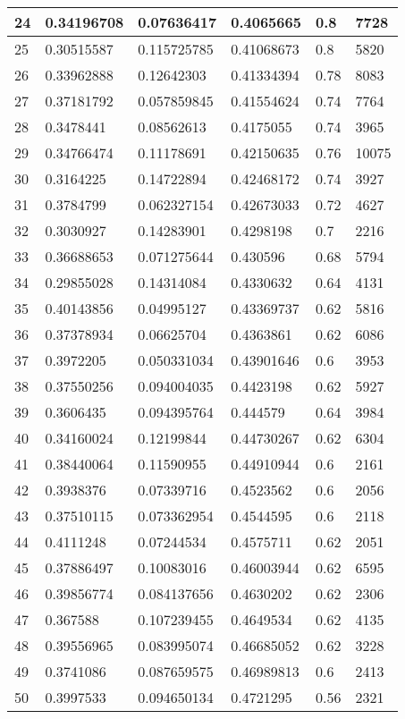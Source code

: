 \begin{longtable}{|l|l|l|l|l|l|}
24 & 0.34196708 & 0.07636417 & 0.4065665 & 0.8 & 7728 \\ \hline 
25 & 0.30515587 & 0.115725785 & 0.41068673 & 0.8 & 5820 \\ \hline 
26 & 0.33962888 & 0.12642303 & 0.41334394 & 0.78 & 8083 \\ \hline 
27 & 0.37181792 & 0.057859845 & 0.41554624 & 0.74 & 7764 \\ \hline 
28 & 0.3478441 & 0.08562613 & 0.4175055 & 0.74 & 3965 \\ \hline 
29 & 0.34766474 & 0.11178691 & 0.42150635 & 0.76 & 10075 \\ \hline 
30 & 0.3164225 & 0.14722894 & 0.42468172 & 0.74 & 3927 \\ \hline 
31 & 0.3784799 & 0.062327154 & 0.42673033 & 0.72 & 4627 \\ \hline 
32 & 0.3030927 & 0.14283901 & 0.4298198 & 0.7 & 2216 \\ \hline 
33 & 0.36688653 & 0.071275644 & 0.430596 & 0.68 & 5794 \\ \hline 
34 & 0.29855028 & 0.14314084 & 0.4330632 & 0.64 & 4131 \\ \hline 
35 & 0.40143856 & 0.04995127 & 0.43369737 & 0.62 & 5816 \\ \hline 
36 & 0.37378934 & 0.06625704 & 0.4363861 & 0.62 & 6086 \\ \hline 
37 & 0.3972205 & 0.050331034 & 0.43901646 & 0.6 & 3953 \\ \hline 
38 & 0.37550256 & 0.094004035 & 0.4423198 & 0.62 & 5927 \\ \hline 
39 & 0.3606435 & 0.094395764 & 0.444579 & 0.64 & 3984 \\ \hline 
40 & 0.34160024 & 0.12199844 & 0.44730267 & 0.62 & 6304 \\ \hline 
41 & 0.38440064 & 0.11590955 & 0.44910944 & 0.6 & 2161 \\ \hline 
42 & 0.3938376 & 0.07339716 & 0.4523562 & 0.6 & 2056 \\ \hline 
43 & 0.37510115 & 0.073362954 & 0.4544595 & 0.6 & 2118 \\ \hline 
44 & 0.4111248 & 0.07244534 & 0.4575711 & 0.62 & 2051 \\ \hline 
45 & 0.37886497 & 0.10083016 & 0.46003944 & 0.62 & 6595 \\ \hline 
46 & 0.39856774 & 0.084137656 & 0.4630202 & 0.62 & 2306 \\ \hline 
47 & 0.367588 & 0.107239455 & 0.4649534 & 0.62 & 4135 \\ \hline 
48 & 0.39556965 & 0.083995074 & 0.46685052 & 0.62 & 3228 \\ \hline 
49 & 0.3741086 & 0.087659575 & 0.46989813 & 0.6 & 2413 \\ \hline 
50 & 0.3997533 & 0.094650134 & 0.4721295 & 0.56 & 2321 \\ \hline 
\end{longtable}